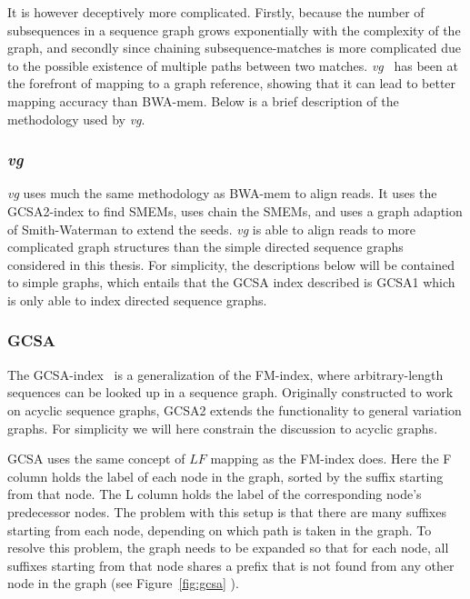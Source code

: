 It is however deceptively more complicated. 
Firstly, because the number of subsequences in a sequence graph grows exponentially with the complexity of the graph, and secondly since chaining subsequence-matches is more complicated due to the possible existence of multiple paths between two matches.
\emph{vg}~\cite{vg} has been at the forefront of mapping to a graph reference, showing that it can lead to better mapping accuracy than BWA-mem. 
Below is a brief description of the methodology used by \emph{vg}.

\subsubsection{\emph{vg}}
\emph{vg} uses much the same methodology as BWA-mem to align reads.
It uses the GCSA2-index to find SMEMs, uses chain  the SMEMs, and uses a graph adaption of Smith-Waterman to extend the seeds.
\emph{vg} is able to align reads to more complicated graph structures than the simple directed sequence graphs considered in this thesis.
For simplicity, the descriptions below will be contained to simple graphs, which entails that the GCSA index described is GCSA1\cite{gcsa1} which is only able to index directed sequence graphs.

\subsubsection{GCSA}
The GCSA-index~\cite{gcsa, gcsa2} is a generalization of the FM-index, where arbitrary-length sequences can be looked up in a sequence graph.
Originally constructed to work on acyclic sequence graphs, GCSA2 extends the functionality to general variation graphs.
For simplicity we will here constrain the discussion to acyclic graphs.

GCSA uses the same concept of $LF$ mapping as the FM-index does. Here the F column holds the label of each node in the graph, sorted by the suffix starting from that node. The L column holds the label of the corresponding node's predecessor nodes. The problem with this setup is that there are many suffixes starting from each node, depending on which path is taken in the graph. To resolve this problem, the graph needs to be expanded so that for each node, all suffixes starting from that node shares a prefix that is not found from any other node in the graph (see Figure~\ref{fig:gcsa} ).

